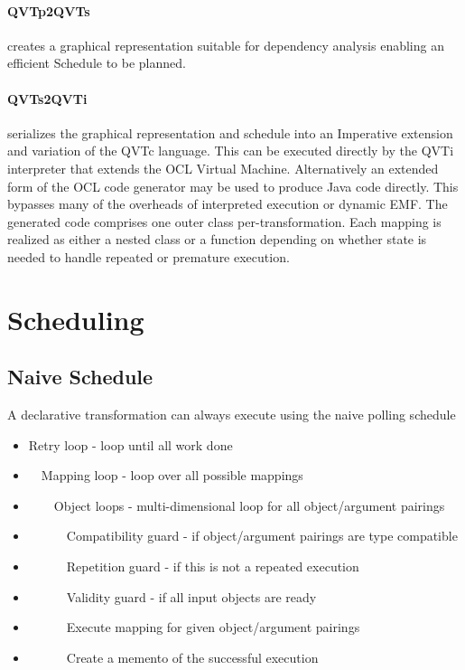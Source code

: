 \documentclass{llncs}
\begin{document}
\paragraph{QVTp2QVTs} creates a graphical representation suitable for dependency analysis enabling an efficient Schedule to be planned.

\paragraph{QVTs2QVTi} serializes the graphical representation and schedule into an Imperative extension and variation of the QVTc language. This can be executed directly by the QVTi interpreter that extends the OCL Virtual Machine. Alternatively an extended form of the OCL code generator may be used to produce Java code directly. This bypasses many of the overheads of interpreted execution or dynamic EMF. The generated code comprises one outer class per-transformation. Each mapping is realized as either a nested class or a function depending on whether state is needed to handle repeated or premature execution.

\section{Scheduling}\label{Scheduling}

\subsection{Naive Schedule}

A declarative transformation can always execute using the naive polling schedule
\begin{itemize}
\item Retry loop - loop until all work done
\item ~~Mapping loop - loop over all possible mappings 
\item ~~~~Object loops - multi-dimensional loop for all object/argument pairings
\item ~~~~~~Compatibility guard - if object/argument pairings are type compatible
\item ~~~~~~Repetition guard - if this is not a repeated execution
\item ~~~~~~Validity guard - if all input objects are ready
\item ~~~~~~Execute mapping for given object/argument pairings
\item ~~~~~~Create a memento of the successful execution
\end{itemize}
\end{document}

